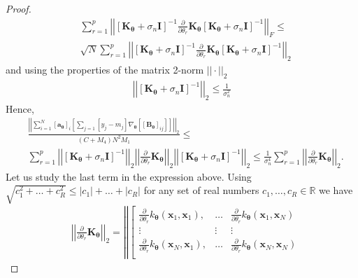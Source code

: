 \documentclass[jair,twoside,11pt,theapa]{article}
\theoremstyle{definition}
\begin{document}
\begin{proof}
\begin{align*}
    &\sum_{r=1}^p\left|\left|\left[\bm{K}_{\boldsymbol{\theta}} + \sigma_{n}\boldsymbol{I}\right]^{-1}\frac{\partial}{\partial\theta_r}\bm{K}_{\boldsymbol{\theta}}\left[\bm{K}_{\boldsymbol{\theta}} + \sigma_{n}\boldsymbol{I}\right]^{-1}\right|\right|_F \le \\\nonumber
    &\sqrt{N}\sum_{r=1}^p\left|\left|\left[\bm{K}_{\boldsymbol{\theta}} + \sigma_{n}\boldsymbol{I}\right]^{-1}\frac{\partial}{\partial\theta_r}\bm{K}_{\boldsymbol{\theta}}\left[\bm{K}_{\boldsymbol{\theta}} + \sigma_{n}\boldsymbol{I}\right]^{-1}\right|\right|_2
\end{align*}
and using the properties of the matrix 2-norm
$||\cdot||_2$
\begin{align*}
    \left|\left|\left[\bm{K}_{\boldsymbol{\theta}} + \sigma_{n}\boldsymbol{I}\right]^{-1}\right|\right|_2 \le \frac{1}{\sigma^2_n}
\end{align*}
Hence,
\begin{align}\label{Eq:intermd_result_two}
    &\frac{\left|\left|\sum_{i=1}^N[\bm{a}_{\bm{\theta}}]_i\left[\sum_{j=1}[y_j - m_j]\nabla_{\bm{\theta}}\left[[\bm{B}_{\bm{\theta}}]_{ij}\right]\right]\right|\right|_2}{(C+M_4)N^2M_1} \le\\\nonumber
    &\sum_{r=1}^p\left|\left|\left[\bm{K}_{\boldsymbol{\theta}} + \sigma_{n}\boldsymbol{I}\right]^{-1}\right|\right|_2\left|\left|\frac{\partial}{\partial\theta_r}\bm{K}_{\boldsymbol{\theta}}\right|\right|_2\left|\left| \left[\bm{K}_{\boldsymbol{\theta}} + \sigma_{n}\boldsymbol{I}\right]^{-1}\right|\right|_2\le \nonumber
    \frac{1}{\sigma^4_n}\sum_{r=1}^p\left|\left|\frac{\partial}{\partial\theta_r}\bm{K}_{\boldsymbol{\theta}}\right|\right|_2.
\end{align}
Let us study the last term in the expression above. Using $\sqrt{c^2_1 + \ldots + c^2_R} \le |c_1| + \ldots + |c_R|$ for any set of real numbers $c_1,\ldots,c_R\in\mathbb{R}$ we have
\begin{align*}
    &\left|\left|\frac{\partial}{\partial\theta_r}\bm{K}_{\boldsymbol{\theta}}\right|\right|_2 = \nonumber
    \left|\left|\left[\begin{array}{ccc}
    \frac{\partial}{\partial\theta_r}k_{\boldsymbol{\theta}}(\boldsymbol{x}_1, \boldsymbol{x}_1), & \ldots & \frac{\partial}{\partial\theta_r}k_{\boldsymbol{\theta}}(\boldsymbol{x}_1, \boldsymbol{x}_N)  \\
      \vdots & \vdots & \vdots \\
      \frac{\partial}{\partial\theta_r}k_{\boldsymbol{\theta}}(\boldsymbol{x}_N, \boldsymbol{x}_1), & \ldots & \frac{\partial}{\partial\theta_r}k_{\boldsymbol{\theta}}(\boldsymbol{x}_N, \boldsymbol{x}_N)  \\ 

\end{array}
\end{align*}
\end{proof}
\end{document}
